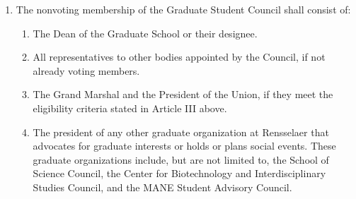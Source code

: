 \begin{enumerate}
\begin{enumerate}
  \end{enumerate}
\item The nonvoting membership of the Graduate Student Council shall consist of:
  \begin{enumerate}
  \item The Dean of the Graduate School or their designee.
  \item All representatives to other bodies appointed by the Council, if not already voting members.
  \item The Grand Marshal and the President of the Union, if they meet the eligibility criteria stated in Article III above.
  \item The president of any other graduate organization at Rensselaer that advocates for graduate interests or holds or plans social events. These graduate organizations include, but are not limited to, the School of Science Council, the Center for Biotechnology and Interdisciplinary Studies Council, and the MANE Student Advisory Council.
  \end{enumerate}
\end{enumerate}


